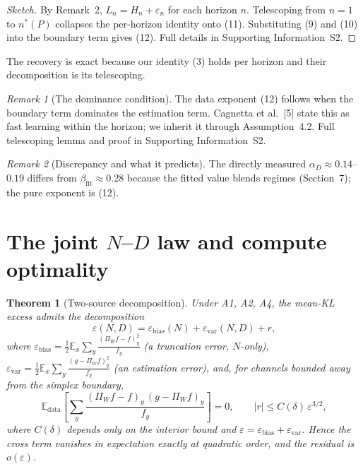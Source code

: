 \documentclass[12pt]{article}
\newcommand{\eps}{\varepsilon}
\newcommand{\E}{\mathbb{E}}
\newcommand{\PiW}{\Pi_{W}}
\newtheorem{theorem}{Theorem}[section]
\theoremstyle{remark}
\newtheorem{remark}{Remark}
\begin{document}
\begin{proof}[Sketch]
By Remark~2, $L_n=H_n+\eps_n$ for each horizon $n$.
Telescoping from $n=1$ to $n^*(P)$ collapses the per-horizon identity onto
(11).  Substituting (9) and (10)
into the boundary term gives (12).  Full details in
Supporting Information~S2.
\end{proof}

The recovery is exact because our identity (3) holds per
horizon and their decomposition is its telescoping.

\begin{remark}[The dominance condition]
\label{rem:dominance}
The data exponent (12) follows when the boundary term dominates
the estimation term.  Cagnetta et al.\ [5] state this as fast learning within the
horizon; we inherit it through Assumption~4.2.  Full
telescoping lemma and proof in Supporting Information~S2.
\end{remark}

\begin{remark}[Discrepancy and what it predicts]
\label{rem:discrepancy}
The directly measured $\alpha_D\!\approx\!0.14$--$0.19$ differs from
$\beta_{\mathrm{fit}}\!\approx\!0.28$ because the fitted value blends regimes
(Section~7); the pure exponent is (12).
\end{remark}

\section{The joint $N$--$D$ law and compute optimality}
\label{sec:joint}

\begin{theorem}[Two-source decomposition]
\label{thm:additive}
Under A1, A2, A4, the mean-KL excess admits the decomposition
\begin{equation}
  \eps(N,D)=\eps_{\mathrm{bias}}(N)+\eps_{\mathrm{var}}(N,D)+r,
  \label{eq:decom}
\end{equation}
where $\eps_{\mathrm{bias}}=\frac12\E_x\sum_y
\frac{(\PiW f-f)_y^2}{f_y}$ (a truncation error, $N$-only),
$\eps_{\mathrm{var}}=\frac12\E_x\sum_y
\frac{(g-\PiW f)_y^2}{f_y}$ (an estimation error), and, for channels bounded
away from the simplex boundary,
\begin{equation}
  \E_{\mathrm{data}}\left[\sum_y\frac{(\PiW f-f)_y\,(g-\PiW f)_y}{f_y}\right]=0,
  \qquad |r|\le C(\delta)\,\eps^{3/2},
  \label{eq:cross}
\end{equation}
where $C(\delta)$ depends only on the interior bound and
$\eps=\eps_{\mathrm{bias}}+\eps_{\mathrm{var}}$. Hence the cross term vanishes in
expectation \emph{exactly} at quadratic order, and the residual is
$o(\eps)$.
\end{theorem}
\end{document}
